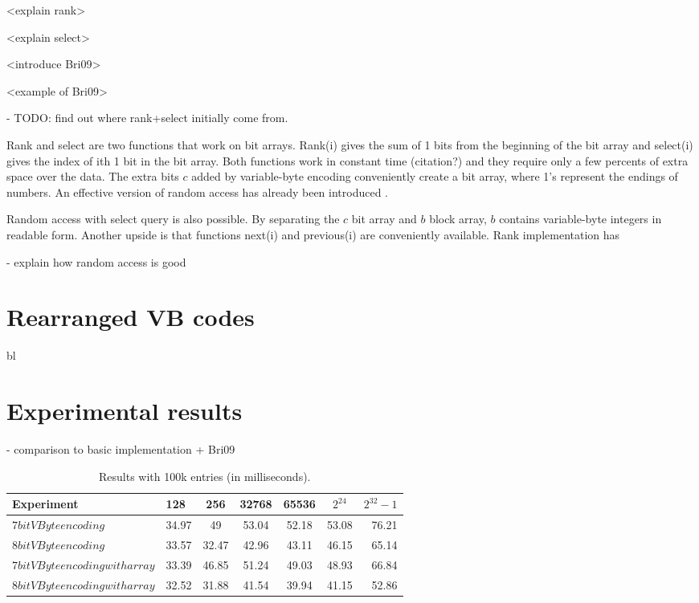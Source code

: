 <explain rank>

<explain select>

<introduce Bri09>

<example of Bri09>

- TODO: find out where rank+select initially come from.

Rank and select are two functions that work on bit arrays. Rank(i) gives the sum of 1 bits from the beginning of the bit array and select(i) gives
the index of ith 1 bit in the bit array. Both functions work in constant time (citation?) and they require only a few percents of extra space over
the data. The extra bits $c$ added by variable-byte encoding conveniently create a bit array, where 1's represent the endings of numbers. An effective
version of random access has already been introduced \citep{Bri09}. 

Random access with select query is also possible.  By separating the $c$ bit array and $b$ block array, $b$ contains variable-byte integers 
in readable form. Another upside is that functions next(i) and previous(i) are conveniently available. Rank implementation has 

- explain how random access is good 

\chapter{Rearranged VB codes}
bl

\chapter{Experimental results}
 - comparison to basic implementation + Bri09
\begin{table}
\centering
\caption{Results with 100k entries (in milliseconds).\label{table:results1}}
\begin{tabular}{l||l c c c c r} 
Experiment & 128 & 256 & 32768 & 65536 & $2^{24}$ & $2^{32} -1$\\ 
\hline \hline 
$7bit VByte encoding$ & 34.97 & 49 & 53.04 & 52.18 & 53.08 & 76.21\\
$8bit VByte encoding$ & 33.57 & 32.47 & 42.96 & 43.11 & 46.15 & 65.14\\
$7bit VByte encoding with array$ & 33.39 & 46.85 & 51.24 & 49.03 & 48.93 & 66.84 \\
$8bit VByte encoding with array$ & 32.52 & 31.88 & 41.54 & 39.94 & 41.15 & 52.86 \\

\hline
%
\end{tabular}
\end{table}

